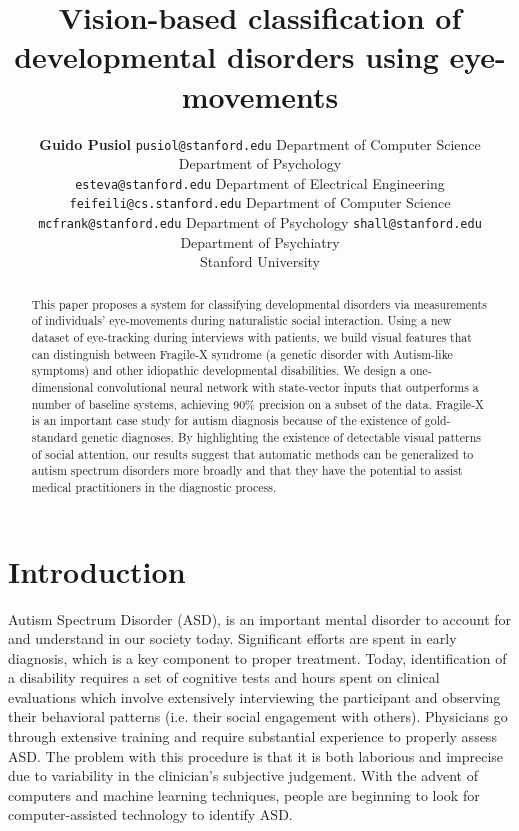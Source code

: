 \documentclass[10pt,twocolumn,letterpaper]{article}
\begin{document}
\title{Vision-based classification of developmental disorders using eye-movements}

\author{{\bf Guido Pusiol}
\texttt{pusiol@stanford.edu}
Department of Computer Science\\
Department of Psychology \\
\texttt{esteva@stanford.edu} 
Department of Electrical Engineering
\texttt{feifeili@cs.stanford.edu} 
Department of Computer Science
\texttt{mcfrank@stanford.edu}
Department of Psychology
\texttt{shall@stanford.edu}\\
  Department of Psychiatry\\
Stanford University}
  

\maketitle

\begin{abstract}
\noindent This paper proposes a system for classifying developmental disorders via measurements of individuals' eye-movements during naturalistic social interaction.
Using a new dataset of eye-tracking during interviews with patients, we build visual features that can distinguish between Fragile-X syndrome (a genetic disorder with Autism-like symptoms) and other idiopathic developmental disabilities. 
We design a one-dimensional convolutional neural network with state-vector inputs that outperforms a number of baseline systems, achieving 90\% precision on a subset of the data.
Fragile-X is an important case study for autism diagnosis because of the existence of gold-standard genetic diagnoses. By highlighting the existence of detectable visual patterns of social attention, our results suggest that automatic methods can be generalized to autism spectrum disorders more broadly and that they have the potential to assist medical practitioners in the diagnostic process. 
\end{abstract}
   
\section{Introduction}
   
Autism Spectrum Disorder (ASD), is an important mental disorder to account for and understand in our society today. Significant efforts are spent in early diagnosis, which is a key component to proper treatment.  Today, identification of a disability requires a set of cognitive tests and hours spent on clinical evaluations which involve extensively interviewing the participant and observing their behavioral patterns (i.e. their social engagement with others). Physicians go through extensive training and require substantial experience to properly assess ASD.  The problem with this procedure is that it is both laborious and imprecise due to variability in the clinician's subjective judgement. With the advent of computers and machine learning techniques, people are beginning to look for computer-assisted technology to identify ASD. 
\end{document}
